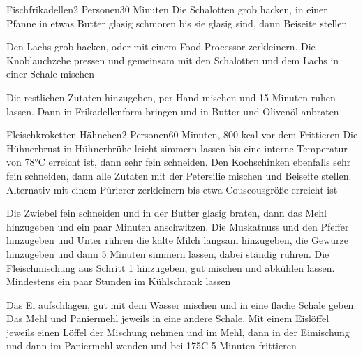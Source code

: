
\begin{recipe}{Fischfrikadellen}{2 Personen}{30 Minuten}
Die Schalotten grob hacken, in einer Pfanne in etwas Butter glasig schmoren bis sie glasig sind, dann Beiseite stellen

Den Lachs grob hacken, oder mit einem Food Processor zerkleinern. Die Knoblauchzehe pressen und gemeinsam mit den Schalotten und dem Lachs in einer Schale mischen

Die restlichen Zutaten hinzugeben, per Hand mischen und 15 Minuten ruhen lassen. Dann in Frikadellenform bringen und in Butter und Olivenöl anbraten
\end{recipe}


\begin{recipe}{Fleischkroketten Hähnchen}{2 Personen}{60 Minuten, 800 kcal vor dem Frittieren}
Die Hühnerbrust in Hühnerbrühe leicht simmern lassen bis eine interne Temperatur von 78\0°C erreicht ist, dann sehr fein schneiden. Den Kochschinken ebenfalls sehr fein schneiden, dann alle Zutaten mit der Petersilie mischen und Beiseite stellen. Alternativ mit einem Pürierer zerkleinern bis etwa Couscousgröße erreicht ist


Die Zwiebel fein schneiden und in der Butter glasig braten, dann das Mehl hinzugeben und ein paar Minuten anschwitzen. Die Muskatnuss und den Pfeffer hinzugeben und 
Unter rühren die kalte Milch langsam hinzugeben, die Gewürze hinzugeben und dann 5 Minuten simmern lassen, dabei ständig rühren. Die Fleischmischung aus Schritt 1 hinzugeben, gut mischen und abkühlen lassen.  Mindestens ein paar Stunden im Kühlschrank lassen

Das Ei aufschlagen, gut mit dem Wasser mischen und in eine flache Schale geben. Das Mehl und Paniermehl jeweils in eine andere Schale. Mit einem Eislöffel jeweils einen Löffel der Mischung nehmen und im Mehl, dann in der Eimischung und dann im Paniermehl wenden und bei 175\0C 5 Minuten frittieren
\end{recipe}


